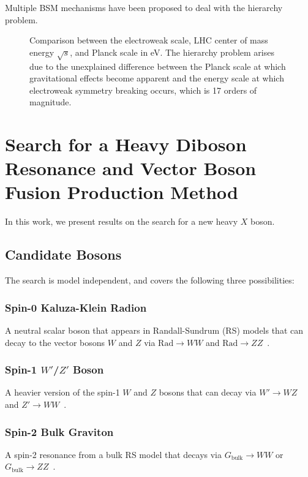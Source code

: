 Multiple BSM mechanisms have been proposed to deal with the hierarchy problem.

\begin{figure}[htbp]
  \centering
  
  \caption{Comparison between the electroweak scale, LHC center of mass energy $\sqrt{s}$, and Planck scale in eV. The hierarchy problem arises due to the unexplained difference between the Planck scale at which gravitational effects become apparent and the energy scale at which electroweak symmetry breaking occurs, which is 17 orders of magnitude.}
  \label{fig:hierarchy}
\end{figure}

\section{Search for a Heavy Diboson Resonance and Vector Boson Fusion Production Method}
\label{sec:VBF}

In this work, we present results on the search for a new heavy $X$ boson.

\subsection{Candidate Bosons}

The search is model independent, and covers the following three possibilities:

\subsubsection{Spin-0 Kaluza-Klein Radion}
A neutral scalar boson that appears in Randall-Sundrum (RS) models that can decay to the vector bosons $W$ and $Z$ via $\mathrm{Rad}\to WW$ and $\mathrm{Rad}\to ZZ$~\cite{Goldberger_1999,Goldberger_2000}.

\subsubsection{Spin-1 $W'$/$Z'$ Boson}
A heavier version of the spin-1 $W$ and $Z$ bosons that can decay via $W'\to WZ$ and $Z'\to WW$~\cite{Pappadopulo_2014}.

\subsubsection{Spin-2 Bulk Graviton}
A spin-2 resonance from a bulk RS model that decays via $G_\mathrm{bulk}\to WW$ or $G_\mathrm{bulk}\to ZZ$~\cite{Fitzpatrick_2007,PhysRevD.76.036006}.

